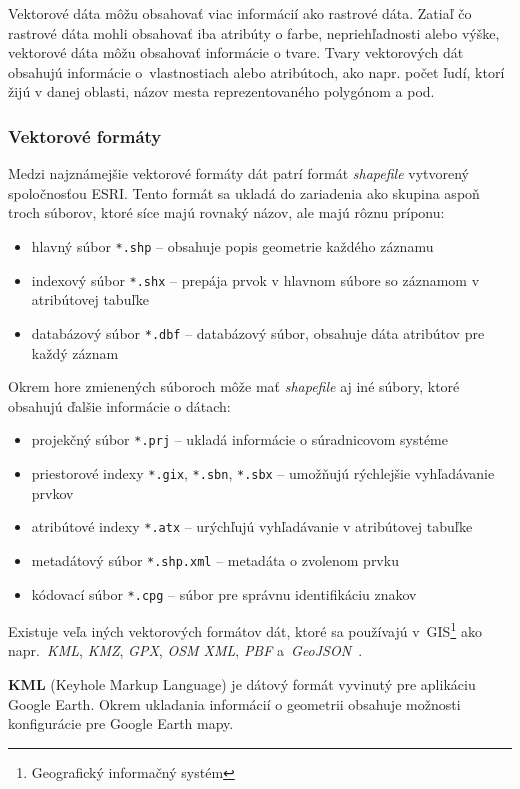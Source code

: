 Vektorové dáta môžu obsahovať viac informácií ako rastrové dáta. Zatiaľ čo rastrové dáta mohli obsahovať iba atribúty o farbe, nepriehľadnosti alebo výške, vektorové dáta môžu obsahovať informácie o tvare. Tvary vektorových dát obsahujú informácie o~vlastnostiach alebo atribútoch, ako napr. počet ľudí, ktorí žijú v danej oblasti, názov mesta reprezentovaného polygónom a pod.

\subsubsection{Vektorové formáty}
Medzi najznámejšie vektorové formáty dát patrí formát \emph{shapefile} vytvorený spoločnosťou ESRI. Tento formát sa ukladá do zariadenia ako skupina aspoň troch súborov, ktoré síce majú rovnaký názov, ale majú rôznu príponu:
\begin{itemize}
    \item hlavný súbor \texttt{*.shp} \--- obsahuje popis geometrie každého záznamu
    \item indexový súbor \texttt{*.shx} \--- prepája prvok v hlavnom súbore so záznamom v atribútovej tabuľke
    \item databázový súbor \texttt{*.dbf} \--- databázový súbor, obsahuje dáta atribútov pre každý záznam
\end{itemize}

Okrem hore zmienených súboroch môže mať \emph{shapefile} aj iné súbory, ktoré obsahujú ďalšie informácie o dátach:
\begin{itemize}
    \item projekčný súbor \texttt{*.prj} \--- ukladá informácie o súradnicovom systéme
    \item priestorové indexy \texttt{*.gix}, \texttt{*.sbn}, \texttt{*.sbx} \--- umožňujú rýchlejšie vyhľadávanie prvkov
    \item atribútové indexy \texttt{*.atx} \--- urýchľujú vyhľadávanie v atribútovej tabuľke
    \item metadátový súbor \texttt{*.shp.xml} \--- metadáta o zvolenom prvku
    \item kódovací súbor \texttt{*.cpg} \--- súbor pre správnu identifikáciu znakov
\end{itemize}

Existuje veľa iných vektorových formátov dát, ktoré sa používajú v~GIS\footnote{Geografický informačný systém} ako napr.~\emph{KML}, \emph{KMZ}, \emph{GPX}, \emph{OSM XML}, \emph{PBF} a~\emph{GeoJSON}~\cite{gis-formats}.

\textbf{KML} (Keyhole Markup Language) je dátový formát vyvinutý pre aplikáciu Google Earth. Okrem ukladania informácií o geometrii obsahuje možnosti konfigurácie pre Google Earth mapy.

